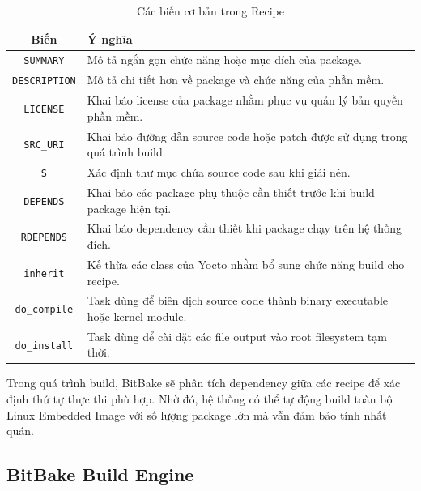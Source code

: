 \begin{table}[H]
\centering


\begin{tabular}{|c|p{9cm}|}
\hline
\textbf{Biến} & \textbf{Ý nghĩa} \\ \hline

\texttt{SUMMARY} &
Mô tả ngắn gọn chức năng hoặc mục đích của package. \\ \hline

\texttt{DESCRIPTION} &
Mô tả chi tiết hơn về package và chức năng của phần mềm. \\ \hline

\texttt{LICENSE} &
Khai báo license của package nhằm phục vụ quản lý bản quyền phần mềm. \\ \hline

\texttt{SRC\_URI} &
Khai báo đường dẫn source code hoặc patch được sử dụng trong quá trình build. \\ \hline

\texttt{S} &
Xác định thư mục chứa source code sau khi giải nén. \\ \hline

\texttt{DEPENDS} &
Khai báo các package phụ thuộc cần thiết trước khi build package hiện tại. \\ \hline

\texttt{RDEPENDS} &
Khai báo dependency cần thiết khi package chạy trên hệ thống đích. \\ \hline

\texttt{inherit} &
Kế thừa các class của Yocto nhằm bổ sung chức năng build cho recipe. \\ \hline

\texttt{do\_compile} &
Task dùng để biên dịch source code thành binary executable hoặc kernel module. \\ \hline

\texttt{do\_install} &
Task dùng để cài đặt các file output vào root filesystem tạm thời. \\ \hline

\end{tabular}
\caption{Các biến cơ bản trong Recipe}
\label{tab:recipe_variables}
\end{table}

Trong quá trình build, BitBake sẽ phân tích dependency giữa các recipe để xác định thứ tự thực thi phù hợp. Nhờ đó, hệ thống có thể tự động build toàn bộ Linux Embedded Image với số lượng package lớn mà vẫn đảm bảo tính nhất quán.

\subsection{BitBake Build Engine}

